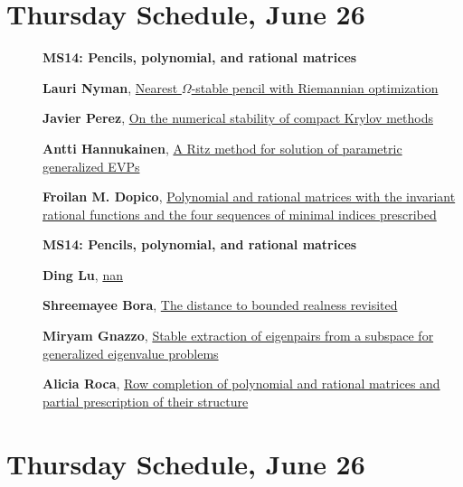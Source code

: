 \documentclass[ILAS2025-program.tex]{subfiles}
\begin{document}
\section*{Thursday Schedule, June 26 }
        
        \begin{description}
    \item[] {\color{mstitle}\textbf{MS14: Pencils, polynomial, and rational matrices}} 
    \item[] \hypertarget{up0327}{}\textbf{Lauri Nyman}, \hyperlink{down0327}{Nearest $\Omega$-stable pencil with Riemannian optimization}
        \item[] \hypertarget{up0328}{}\textbf{Javier Perez}, \hyperlink{down0328}{On the numerical stability of compact Krylov methods}
        \item[] \hypertarget{up0329}{}\textbf{Antti Hannukainen}, \hyperlink{down0329}{A Ritz method for solution of parametric generalized EVPs}
        \item[] \hypertarget{up0330}{}\textbf{Froilan M. Dopico}, \hyperlink{down0330}{Polynomial and rational matrices with the invariant rational functions and the four sequences of minimal indices prescribed}
        \end{description}
    \begin{description}
    \item[] {\color{mstitle}\textbf{MS14: Pencils, polynomial, and rational matrices}} 
    \item[] \hypertarget{up0371}{}\textbf{Ding Lu}, \hyperlink{down0371}{nan}
        \item[] \hypertarget{up0372}{}\textbf{Shreemayee Bora}, \hyperlink{down0372}{The distance to bounded realness revisited}
        \item[] \hypertarget{up0373}{}\textbf{Miryam Gnazzo}, \hyperlink{down0373}{Stable extraction of eigenpairs from a subspace for generalized eigenvalue problems}
        \item[] \hypertarget{up0374}{}\textbf{Alicia Roca}, \hyperlink{down0374}{Row completion of polynomial and rational matrices and partial prescription of their  structure}
        \end{description}
    \newpage

\section*{Thursday Schedule, June 26 }
        
\end{document}
